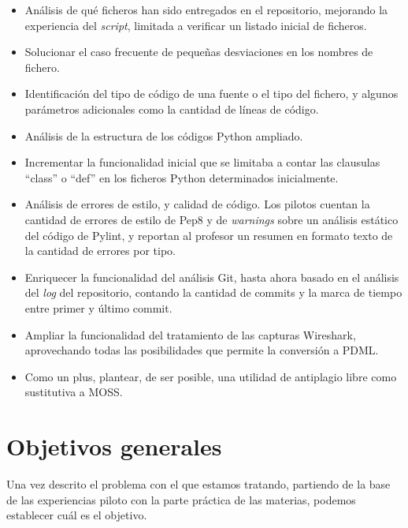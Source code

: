 \begin{itemize}
\item Análisis de qué ficheros han sido entregados en el repositorio, mejorando la experiencia del \textit{script}, limitada a verificar un listado inicial de ficheros.

\item Solucionar el caso frecuente de pequeñas desviaciones en los nombres de fichero.

\item Identificación del tipo de código de una fuente o el tipo del fichero, y algunos 	parámetros adicionales como la cantidad de líneas de código.

\item Análisis de la estructura de los códigos Python ampliado.

\item Incrementar la funcionalidad inicial que se limitaba a contar las clausulas ``class'' o ``def'' en los ficheros Python determinados inicialmente.

\item Análisis de errores de estilo, y calidad de código. Los pilotos cuentan la cantidad de errores de estilo de Pep8 y de \textit{warnings} sobre un análisis estático del código de Pylint, y reportan al profesor un resumen en formato texto de la cantidad de errores por tipo.

\item Enriquecer la funcionalidad del análisis Git, hasta ahora basado en el análisis del \textit{log} del repositorio, contando la cantidad de commits y la marca de tiempo entre primer y último commit.

\item Ampliar la funcionalidad del tratamiento de las capturas Wireshark, aprovechando todas las posibilidades que permite la conversión a PDML.

\item Como un plus, plantear, de ser posible, una utilidad de antiplagio libre como sustitutiva a MOSS.
\end{itemize}


\section{Objetivos generales}
\label{sec:obj_gen}


Una vez descrito el problema con el que estamos tratando, partiendo de la base de las experiencias piloto con la parte práctica de las materias, podemos establecer cuál es el objetivo.



